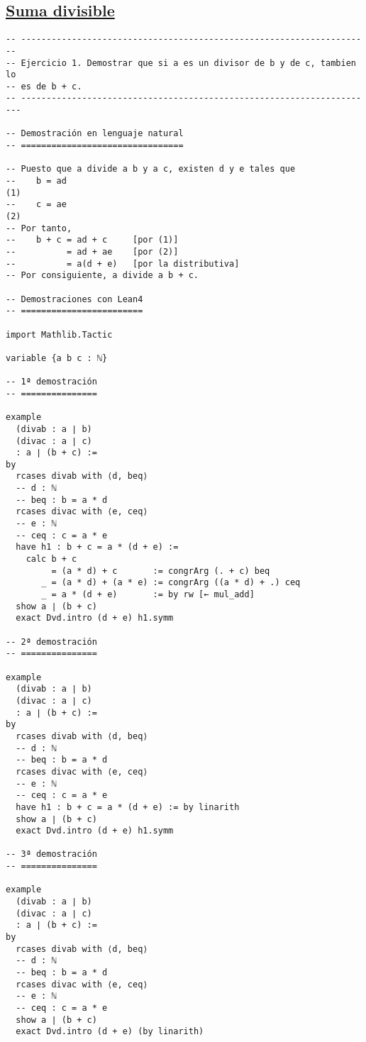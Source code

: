 \subsection{\href{./src/Logica/Suma\_divisible.lean}{Suma divisible}}
\label{sec:org43f9a15}
\begin{verbatim}
-- ---------------------------------------------------------------------
-- Ejercicio 1. Demostrar que si a es un divisor de b y de c, tambien lo
-- es de b + c.
-- ----------------------------------------------------------------------

-- Demostración en lenguaje natural
-- ================================

-- Puesto que a divide a b y a c, existen d y e tales que
--    b = ad                                                         (1)
--    c = ae                                                         (2)
-- Por tanto,
--    b + c = ad + c     [por (1)]
--          = ad + ae    [por (2)]
--          = a(d + e)   [por la distributiva]
-- Por consiguiente, a divide a b + c.

-- Demostraciones con Lean4
-- ========================

import Mathlib.Tactic

variable {a b c : ℕ}

-- 1ª demostración
-- ===============

example
  (divab : a ∣ b)
  (divac : a ∣ c)
  : a ∣ (b + c) :=
by
  rcases divab with ⟨d, beq⟩
  -- d : ℕ
  -- beq : b = a * d
  rcases divac with ⟨e, ceq⟩
  -- e : ℕ
  -- ceq : c = a * e
  have h1 : b + c = a * (d + e) :=
    calc b + c
         = (a * d) + c       := congrArg (. + c) beq
       _ = (a * d) + (a * e) := congrArg ((a * d) + .) ceq
       _ = a * (d + e)       := by rw [← mul_add]
  show a ∣ (b + c)
  exact Dvd.intro (d + e) h1.symm

-- 2ª demostración
-- ===============

example
  (divab : a ∣ b)
  (divac : a ∣ c)
  : a ∣ (b + c) :=
by
  rcases divab with ⟨d, beq⟩
  -- d : ℕ
  -- beq : b = a * d
  rcases divac with ⟨e, ceq⟩
  -- e : ℕ
  -- ceq : c = a * e
  have h1 : b + c = a * (d + e) := by linarith
  show a ∣ (b + c)
  exact Dvd.intro (d + e) h1.symm

-- 3ª demostración
-- ===============

example
  (divab : a ∣ b)
  (divac : a ∣ c)
  : a ∣ (b + c) :=
by
  rcases divab with ⟨d, beq⟩
  -- d : ℕ
  -- beq : b = a * d
  rcases divac with ⟨e, ceq⟩
  -- e : ℕ
  -- ceq : c = a * e
  show a ∣ (b + c)
  exact Dvd.intro (d + e) (by linarith)


\end{verbatim}
